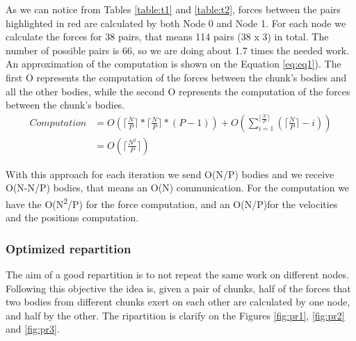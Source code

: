 \documentclass[a4paper]{article}
\begin{document}
As we can notice from Tables \ref{table:t1} and \ref{table:t2}, forces between the pairs highlighted in red are calculated by both Node 0 and Node 1. For each node we calculate the forces for 38 pairs, that means 114 pairs (38 x 3) in total. The number of possible pairs is 66, so we are doing about 1.7 times the needed work. \\
An approximation of the computation is shown on the Equation \ref{eq:eq1}). The first O represents the computation of the forces between the chunk's bodies and all the other bodies, while the second O represents the computation of the forces between the chunk's bodies. \\

\begin{equation} 
\label{eq:eq1}
\begin{split}
Computation & = O(\lceil\frac{N}{P}\rceil * \lceil\frac{N}{P}\rceil * (P-1)) +  O(\sum_{i=1}^{\lceil\frac{N}{P}\rceil} {(\lceil\frac{N}{P}\rceil-i)})\\
 & = O(\lceil\frac{N^2}{P}\rceil)
\end{split}
\end{equation}

With this approach for each iteration we send O(N/P) bodies and we receive O(N-N/P) bodies, that means an O(N) communication. For the computation we have the O(N\textsuperscript{2}/P) for the force computation, and an O(N/P)for the velocities and the positions computation.

\subsubsection{Optimized repartition}
\label{sec:opt_rep}
The aim of a good repartition is to not repeat the same work on different nodes. Following this objective the idea is, given a pair of chunks, half of the forces that two bodies from different chunks exert on each other are calculated by one node, and half by the other. The ripartition is clarify on the Figures \ref{fig:pr1}, \ref{fig:pr2} and \ref{fig:pr3}.
\end{document}
